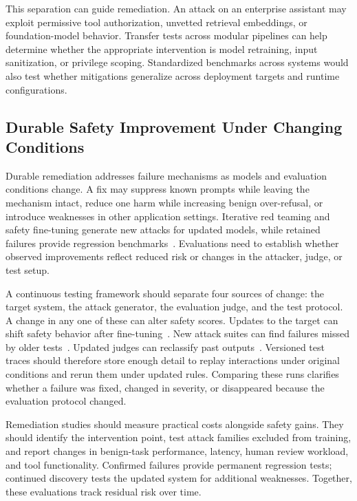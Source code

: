 \documentclass[review]{fcs}
\let\fcsOriginalCite\cite
\renewcommand{\cite}[1]{\allowbreak\fcsOriginalCite{#1}}
\begin{document}
This separation can guide remediation. An attack on an enterprise assistant may exploit permissive tool authorization, unvetted retrieval embeddings, or foundation-model behavior. Transfer tests across modular pipelines can help determine whether the appropriate intervention is model retraining, input sanitization, or privilege scoping. Standardized benchmarks across systems would also test whether mitigations generalize across deployment targets and runtime configurations.

\subsection{Durable Safety Improvement Under Changing Conditions}
\label{sec:agenda_remediation}

Durable remediation addresses failure mechanisms as models and evaluation conditions change. A fix may suppress known prompts while leaving the mechanism intact, reduce one harm while increasing benign over-refusal, or introduce weaknesses in other application settings. Iterative red teaming and safety fine-tuning generate new attacks for updated models, while retained failures provide regression benchmarks~\cite{zhou2025autoredteamer,zhang2025jbdistill}. Evaluations need to establish whether observed improvements reflect reduced risk or changes in the attacker, judge, or test setup.

A continuous testing framework should separate four sources of change: the target system, the attack generator, the evaluation judge, and the test protocol. A change in any one of these can alter safety scores. Updates to the target can shift safety behavior after fine-tuning~\cite{khan2026safetydrift,peng2026cwac}. New attack suites can find failures missed by older tests~\cite{doumbouya2025h4rm3l,zhang2025jbdistill}. Updated judges can reclassify past outputs~\cite{thakur2025judgingjudges,chen2025saferluckier}. Versioned test traces should therefore store enough detail to replay interactions under original conditions and rerun them under updated rules. Comparing these runs clarifies whether a failure was fixed, changed in severity, or disappeared because the evaluation protocol changed.

Remediation studies should measure practical costs alongside safety gains. They should identify the intervention point, test attack families excluded from training, and report changes in benign-task performance, latency, human review workload, and tool functionality. Confirmed failures provide permanent regression tests; continued discovery tests the updated system for additional weaknesses. Together, these evaluations track residual risk over time.
\end{document}
